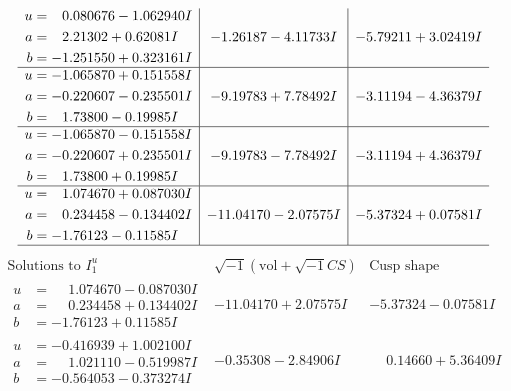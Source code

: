\documentclass[1p]{elsarticle_modified}
\theoremstyle{definition}
\newcommand{\I}{\sqrt{-1}}
\begin{document}
$$\begin{array}{c|c|c}
\begin{aligned}
u &= \phantom{-}0.080676 - 1.062940 I \\
a &= \phantom{-}2.21302 + 0.62081 I \\
b &= -1.251550 + 0.323161 I\end{aligned}
 & -1.26187 - 4.11733 I & -5.79211 + 3.02419 I \\ \hline\begin{aligned}
u &= -1.065870 + 0.151558 I \\
a &= -0.220607 - 0.235501 I \\
b &= \phantom{-}1.73800 - 0.19985 I\end{aligned}
 & -9.19783 + 7.78492 I & -3.11194 - 4.36379 I \\ \hline\begin{aligned}
u &= -1.065870 - 0.151558 I \\
a &= -0.220607 + 0.235501 I \\
b &= \phantom{-}1.73800 + 0.19985 I\end{aligned}
 & -9.19783 - 7.78492 I & -3.11194 + 4.36379 I \\ \hline\begin{aligned}
u &= \phantom{-}1.074670 + 0.087030 I \\
a &= \phantom{-}0.234458 - 0.134402 I \\
b &= -1.76123 - 0.11585 I\end{aligned}
 & -11.04170 - 2.07575 I & -5.37324 + 0.07581 I\\
 \hline 
 \end{array}$$\newpage$$\begin{array}{c|c|c}  
\text{Solutions to }I^u_{1}& \I (\text{vol} + \sqrt{-1}CS) & \text{Cusp shape}\\
 \hline 
\begin{aligned}
u &= \phantom{-}1.074670 - 0.087030 I \\
a &= \phantom{-}0.234458 + 0.134402 I \\
b &= -1.76123 + 0.11585 I\end{aligned}
 & -11.04170 + 2.07575 I & -5.37324 - 0.07581 I \\ \hline\begin{aligned}
u &= -0.416939 + 1.002100 I \\
a &= \phantom{-}1.021110 - 0.519987 I \\
b &= -0.564053 - 0.373274 I\end{aligned}
 & -0.35308 - 2.84906 I & \phantom{-}0.14660 + 5.36409 I \\ \hline\begin{aligned}

\end{aligned}
\end{array}$$
\end{document}
